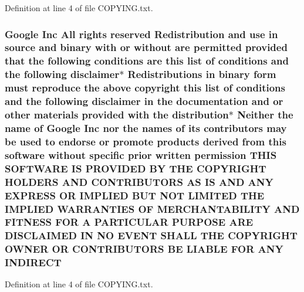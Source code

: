 Definition at line 4 of file C\+O\+P\+Y\+I\+N\+G.\+txt.

\subsubsection[{\texorpdfstring{I\+N\+D\+I\+R\+E\+CT}{INDIRECT}}]{\setlength{\rightskip}{0pt plus 5cm}Google Inc All rights reserved Redistribution and use in source and binary with or without are permitted provided that the following conditions are this {\bf list} of conditions and the following disclaimer$\ast$ Redistributions in binary form must reproduce the above copyright this {\bf list} of conditions and the following disclaimer in the documentation and or other materials provided with the distribution$\ast$ Neither the name of Google Inc nor the names of its contributors may be used to endorse or promote products derived from this software without specific prior written permission T\+H\+IS S\+O\+F\+T\+W\+A\+RE IS P\+R\+O\+V\+I\+D\+ED BY T\+HE C\+O\+P\+Y\+R\+I\+G\+HT H\+O\+L\+D\+E\+RS A\+ND C\+O\+N\+T\+R\+I\+B\+U\+T\+O\+RS AS IS A\+ND A\+NY E\+X\+P\+R\+E\+SS OR I\+M\+P\+L\+I\+ED B\+UT N\+OT L\+I\+M\+I\+T\+ED T\+HE I\+M\+P\+L\+I\+ED {\bf W\+A\+R\+R\+A\+N\+T\+I\+ES} OF M\+E\+R\+C\+H\+A\+N\+T\+A\+B\+I\+L\+I\+TY A\+ND F\+I\+T\+N\+E\+SS F\+OR A P\+A\+R\+T\+I\+C\+U\+L\+AR P\+U\+R\+P\+O\+SE A\+RE D\+I\+S\+C\+L\+A\+I\+M\+ED IN NO E\+V\+E\+NT S\+H\+A\+LL T\+HE C\+O\+P\+Y\+R\+I\+G\+HT O\+W\+N\+ER OR C\+O\+N\+T\+R\+I\+B\+U\+T\+O\+RS BE L\+I\+A\+B\+LE F\+OR A\+NY I\+N\+D\+I\+R\+E\+CT}\hypertarget{COPYING_8txt_aef79968d412fcedee72a1effea35b4b7}{}\label{COPYING_8txt_aef79968d412fcedee72a1effea35b4b7}


Definition at line 4 of file C\+O\+P\+Y\+I\+N\+G.\+txt.

